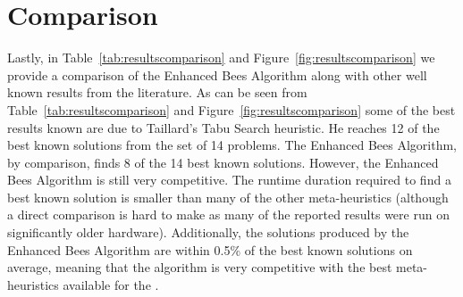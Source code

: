 \section{Comparison}
\label{sec:comparison}

Lastly, in Table~\ref{tab:resultscomparison} and Figure~\ref{fig:resultscomparison} we provide a comparison of the Enhanced Bees Algorithm along with other well known results from the literature. As can be seen from Table~\ref{tab:resultscomparison} and Figure~\ref{fig:resultscomparison} some of the best results known are due to Taillard's Tabu Search heuristic. He reaches 12 of the best known solutions from the set of 14 problems. The Enhanced Bees Algorithm, by comparison, finds 8 of the 14 best known solutions. However, the Enhanced Bees Algorithm is still very competitive. The runtime duration required to find a best known solution is smaller than many of the other meta-heuristics (although a direct comparison is hard to make as many of the reported results were run on significantly older hardware). Additionally, the solutions produced by the Enhanced Bees Algorithm are within 0.5\% of the best known solutions on average, meaning that the algorithm is very competitive with the best meta-heuristics available for the \VRP.

